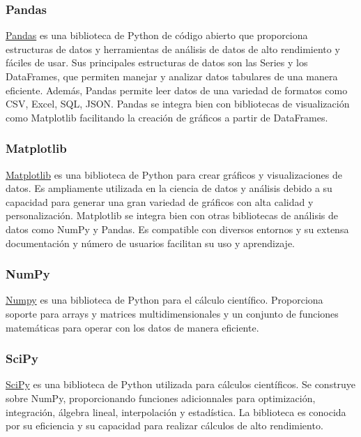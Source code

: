 \subsubsection{Pandas}
\href{https://pandas.pydata.org/}{Pandas} es una biblioteca de Python de código abierto que proporciona estructuras de datos y herramientas de análisis de datos de alto rendimiento y fáciles de usar. Sus principales estructuras de datos son las Series y los DataFrames, que permiten manejar y analizar datos tabulares de una manera eficiente. Además, Pandas permite leer datos de una variedad de formatos como CSV, Excel, SQL, JSON. Pandas se integra bien con bibliotecas de visualización como Matplotlib facilitando la creación de gráficos a partir de DataFrames.

\subsubsection{Matplotlib}
\href{https://matplotlib.org/}{Matplotlib} es una biblioteca de Python para crear gráficos y visualizaciones de datos. Es ampliamente utilizada en la ciencia de datos y análisis debido a su capacidad para generar una gran variedad de gráficos con alta calidad y personalización. Matplotlib se integra bien con otras bibliotecas de análisis de datos como NumPy y Pandas. Es compatible con diversos entornos y su extensa documentación y número de usuarios facilitan su uso y aprendizaje.

\subsubsection{NumPy}
\href{https://numpy.org/}{Numpy} es una biblioteca de Python para el cálculo científico. Proporciona soporte para arrays y matrices multidimensionales y un conjunto de funciones matemáticas para operar con los datos de manera eficiente.
\subsubsection{SciPy}
\href{https://scipy.org/}{SciPy} es una biblioteca de Python utilizada para cálculos científicos. Se construye sobre NumPy, proporcionando funciones adicionnales para optimización, integración, álgebra lineal, interpolación y estadística. La biblioteca es conocida por su eficiencia y su capacidad para realizar cálculos de alto rendimiento.
